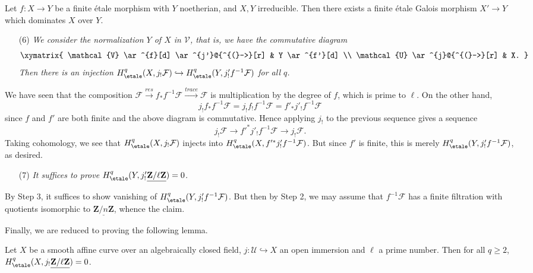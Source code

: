 \begin{exercise}
\label{exercise-finite-etale-under-galois}
Let $f: X \to Y$ be a finite \'etale morphism with $Y$ noetherian, and $X, Y$
irreducible. Then there exists a finite \'etale Galois morphism $X' \to Y$
which dominates $X$ over $Y$.
\end{exercise}

\begin{enumerate}
\item[(6)]
{\it We consider the normalization $Y$ of $X$ in $\mathcal{V}$, that is, we
have the commutative diagram
$$
\xymatrix{
\mathcal{V} \ar^{f}[d] \ar^{j'}@{^{(}->}[r] & Y \ar^{f'}[d] \\
\mathcal{U} \ar^{j}@{^{(}->}[r] & X.
}
$$
Then there is an injection
$H_\etale^q(X, j_!\mathcal{F}) \hookrightarrow
H_\etale^q(Y, j'_! f^{-1} \mathcal{F})$ for all $q$.}
\end{enumerate}
We have seen that the composition $\mathcal{F} \xrightarrow{res} f_* f^{-1}
\mathcal{F} \xrightarrow{trace} \mathcal{F}$ is multiplication by the degree of
$f$, which is prime to $\ell$. On the other hand,
$$
j_! f_* f^{-1} \mathcal{F} = j_! f_! f^{-1} \mathcal{F} = f'_* j'_!
f^{-1}\mathcal{F}
$$
since $f$ and $f'$ are both finite and the above diagram is commutative. Hence
applying $j_!$ to the previous sequence gives a sequence
$$
j_! \mathcal{F} \longrightarrow f'^* j'_! f^{-1} \mathcal{F} \longrightarrow
j_! \mathcal{F}.
$$
Taking cohomology, we see that $H_\etale^q(X, j_!\mathcal{F})$
injects into $H_\etale^q( X , f'^* j'_! f^{-1} \mathcal{F})$.
But since $f'$ is finite, this
is merely $H_\etale^q( Y, j'_! f^{-1} \mathcal{F})$, as desired.
\begin{enumerate}
\item[(7)]
{\it It suffices to prove $H_\etale^q (Y, j'_!
\underline{\mathbf{Z}/\ell\mathbf{Z}}) = 0$.}
\end{enumerate}
By Step 3, it suffices to show vanishing of $H_\etale^q( Y, j'_! f^{-1}
\mathcal{F})$. But then by Step 2, we may assume that $f^{-1}\mathcal{F}$ has a
finite filtration with quotients isomorphic to
$\underline{\mathbf{Z}/n\mathbf{Z}}$, whence the claim.

\medskip\noindent
Finally, we are reduced to proving the following lemma.

\begin{lemma}
\label{lemma-even-easier}
Let $X$ be a smooth affine curve over an algebraically closed field, $j:
\mathcal{U} \hookrightarrow X$ an open immersion and $\ell$ a prime number.
Then for all $q \geq 2$, $H_\etale^q(X, j_!
\underline{\mathbf{Z}/\ell\mathbf{Z}}) = 0$.
\end{lemma}

